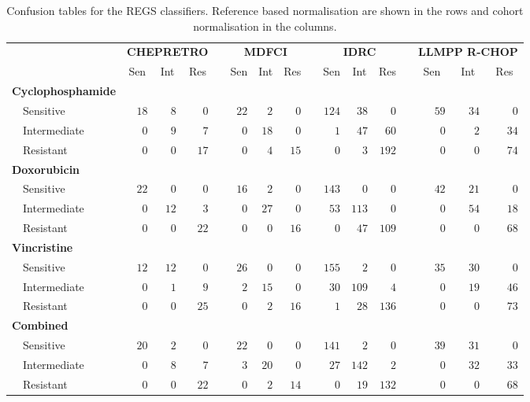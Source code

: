 \begin{table}[!tbp]
{\small
\caption{Confusion tables for the REGS classifiers.
Reference based normalisation are shown in the rows and cohort normalisation in
the columns.\label{tab:confusiondrugreference}} 
\begin{center}
\begin{tabular}{lrrrcrrrcrrrcrrr}
\hline\hline
\multicolumn{1}{l}{\bfseries }&\multicolumn{3}{c}{\bfseries CHEPRETRO}&\multicolumn{1}{c}{\bfseries }&\multicolumn{3}{c}{\bfseries MDFCI}&\multicolumn{1}{c}{\bfseries }&\multicolumn{3}{c}{\bfseries IDRC}&\multicolumn{1}{c}{\bfseries }&\multicolumn{3}{c}{\bfseries LLMPP R-CHOP}\tabularnewline
\cline{2-4} \cline{6-8} \cline{10-12} \cline{14-16}
\multicolumn{1}{l}{}&\multicolumn{1}{c}{Sen}&\multicolumn{1}{c}{Int}&\multicolumn{1}{c}{Res}&\multicolumn{1}{c}{}&\multicolumn{1}{c}{Sen}&\multicolumn{1}{c}{Int}&\multicolumn{1}{c}{Res}&\multicolumn{1}{c}{}&\multicolumn{1}{c}{Sen}&\multicolumn{1}{c}{Int}&\multicolumn{1}{c}{Res}&\multicolumn{1}{c}{}&\multicolumn{1}{c}{Sen}&\multicolumn{1}{c}{Int}&\multicolumn{1}{c}{Res}\tabularnewline
\hline
{\bfseries Cyclophosphamide}&&&&&&&&&&&&&&&\tabularnewline
~~Sensitive&$18$&$ 8$&$ 0$&&$22$&$ 2$&$ 0$&&$124$&$ 38$&$  0$&&$59$&$34$&$ 0$\tabularnewline
~~Intermediate&$ 0$&$ 9$&$ 7$&&$ 0$&$18$&$ 0$&&$  1$&$ 47$&$ 60$&&$ 0$&$ 2$&$34$\tabularnewline
~~Resistant&$ 0$&$ 0$&$17$&&$ 0$&$ 4$&$15$&&$  0$&$  3$&$192$&&$ 0$&$ 0$&$74$\tabularnewline
\hline
{\bfseries Doxorubicin}&&&&&&&&&&&&&&&\tabularnewline
~~Sensitive&$22$&$ 0$&$ 0$&&$16$&$ 2$&$ 0$&&$143$&$  0$&$  0$&&$42$&$21$&$ 0$\tabularnewline
~~Intermediate&$ 0$&$12$&$ 3$&&$ 0$&$27$&$ 0$&&$ 53$&$113$&$  0$&&$ 0$&$54$&$18$\tabularnewline
~~Resistant&$ 0$&$ 0$&$22$&&$ 0$&$ 0$&$16$&&$  0$&$ 47$&$109$&&$ 0$&$ 0$&$68$\tabularnewline
\hline
{\bfseries Vincristine}&&&&&&&&&&&&&&&\tabularnewline
~~Sensitive&$12$&$12$&$ 0$&&$26$&$ 0$&$ 0$&&$155$&$  2$&$  0$&&$35$&$30$&$ 0$\tabularnewline
~~Intermediate&$ 0$&$ 1$&$ 9$&&$ 2$&$15$&$ 0$&&$ 30$&$109$&$  4$&&$ 0$&$19$&$46$\tabularnewline
~~Resistant&$ 0$&$ 0$&$25$&&$ 0$&$ 2$&$16$&&$  1$&$ 28$&$136$&&$ 0$&$ 0$&$73$\tabularnewline
\hline
{\bfseries Combined}&&&&&&&&&&&&&&&\tabularnewline
~~Sensitive&$20$&$ 2$&$ 0$&&$22$&$ 0$&$ 0$&&$141$&$  2$&$  0$&&$39$&$31$&$ 0$\tabularnewline
~~Intermediate&$ 0$&$ 8$&$ 7$&&$ 3$&$20$&$ 0$&&$ 27$&$142$&$  2$&&$ 0$&$32$&$33$\tabularnewline
~~Resistant&$ 0$&$ 0$&$22$&&$ 0$&$ 2$&$14$&&$  0$&$ 19$&$132$&&$ 0$&$ 0$&$68$\tabularnewline
\hline
\end{tabular}\end{center}}

\end{table}
